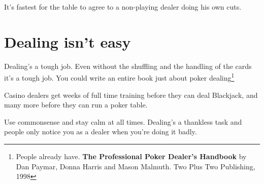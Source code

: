 It's fastest for the table to agree to a non-playing dealer
doing his own cuts.

\section{Dealing isn't easy}

Dealing's a tough job. Even without the shuffling and the handling
of the cards it's a tough job. You could write an entire book
just about poker dealing\footnote{People already have. \textbf{The
Professional Poker Dealer's Handbook} by Dan Paymar, Donna Harris
and Mason Malmuth. Two Plus Two Publishing, 1998}

Casino dealers get weeks of full time training before they can deal
Blackjack, and many more before they can run a poker table.

Use commonsense and stay calm at all times. Dealing's a
thankless task and people only notice you as a dealer when you're
doing it badly.



